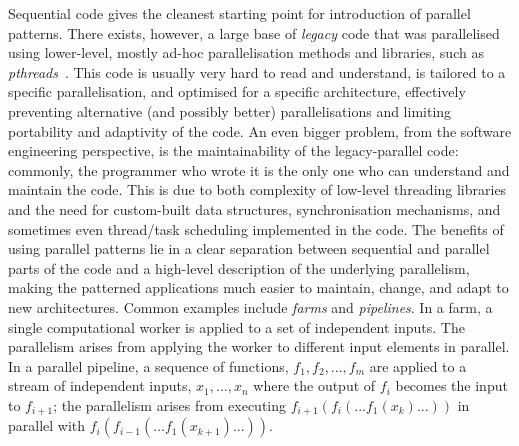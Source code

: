 Sequential code gives the cleanest starting point for introduction of parallel patterns. There exists, however, a large base of \emph{legacy} code  that was parallelised using lower-level, mostly ad-hoc parallelisation methods and libraries, such as \emph{pthreads}~\cite{10.5555/263953}. This code is usually very hard to read and understand, is tailored to a specific parallelisation, and optimised for a specific architecture, effectively preventing alternative (and possibly better) parallelisations and limiting portability and adaptivity of the code. An even bigger problem, from the software engineering perspective, is the maintainability of the legacy-parallel code: commonly, the programmer who wrote it is the only one who can understand and maintain the code. This is due to both complexity of low-level threading libraries and the need for custom-built data structures, synchronisation mechanisms, and sometimes even thread/task scheduling implemented in the code. 
%
The benefits of using parallel patterns lie in a clear separation between sequential and parallel parts of the code and a high-level description of the underlying parallelism, making the patterned applications much easier to maintain, change, and adapt to new architectures. Common examples include \emph{farms} and \emph{pipelines}.
%
In a farm, a single computational worker is applied to a set of independent inputs. The parallelism arises from applying the worker to different input elements in parallel. 
In a parallel pipeline, a sequence of functions, $f_{1}, f_{2}, ..., f_{m}$ are applied to a stream of independent inputs, $x_{1}, ..., x_{n}$ where the output of $f_{i}$ becomes the input to $f_{i+1}$; the parallelism arises from executing $f_{i+1}(f_{i}(...f_{1}(x_{k})...))$ in parallel with $f_{i}(f_{i-1}(...f_{1}(x_{k+1})...))$.



  
